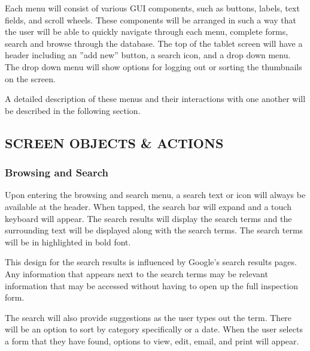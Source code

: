 \documentclass[twoside,letterpaper]{article}
\begin{document}
{{\noindent Each menu will consist of various GUI components, such as buttons, labels, text fields, and scroll wheels. These components will be arranged in such a way that the user will be able to quickly navigate through each menu, complete forms, search and browse through the database.
The top of the tablet screen will have a header including an ''add new'' button, a search icon, and a drop down menu. The drop down menu will show options for logging out or sorting the thumbnails on the screen.
\newline

\noindent A detailed description of these menus and their interactions with one another will be described in the following section.
}
\newpage
\subsection[SCREEN OBJECTS \& ACTIONS]{\rmfamily\bfseries\color{black}
SCREEN OBJECTS \& ACTIONS}
\subsubsection[Browsing and Search]{\rmfamily\bfseries\color{black}
Browsing and Search}
Upon entering the browsing and search menu, a search text or icon will always be available at the header. When tapped, the search bar will expand and a touch keyboard will appear. The search results will display the search terms and the surrounding text will be displayed along with the search terms. The search terms will be in highlighted in bold font.
\newline

\noindent This design for the search results is influenced by Google's search results pages. Any information that appears next to the search terms may be relevant information that may be accessed without having to open up the full inspection form.
\newline

\noindent The search will also provide suggestions as the user types out the term. There will be an option to sort by category specifically or a date. When the user selects a form that they have found, options to view, edit, email, and print will appear.
\newline

}
\end{document}
